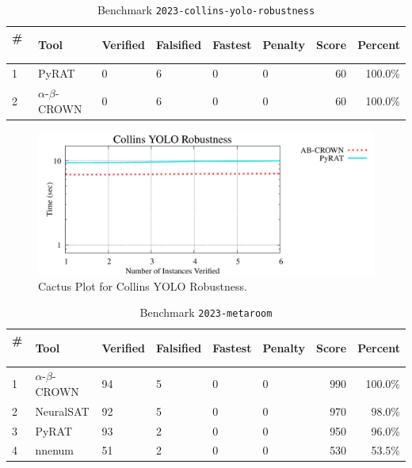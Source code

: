 
\begin{table}[h]
\begin{center}
\caption{Benchmark \texttt{2023-collins-yolo-robustness}} \label{tab:cat_{cat}}
{\setlength{\tabcolsep}{2pt}
\begin{tabular}[h]{@{}llllllrr@{}}
\toprule
\textbf{\# ~} & \textbf{Tool} & \textbf{Verified} & \textbf{Falsified} & \textbf{Fastest} & \textbf{Penalty} & \textbf{Score} & \textbf{Percent}\\
\midrule
1 & PyRAT & 0 & 6 & 0 & 0 & 60 & 100.0\% \\
2 & $\alpha$-$\beta$-CROWN & 0 & 6 & 0 & 0 & 60 & 100.0\% \\
\bottomrule
\end{tabular}
}
\end{center}
\end{table}



\begin{figure}[h]
\centerline{\includegraphics[width=\textwidth]{cactus/2023_collins_yolo_robustness.pdf}}
\caption{Cactus Plot for Collins YOLO Robustness.}
\label{fig:quantPic}
\end{figure}



\begin{table}[h]
\begin{center}
\caption{Benchmark \texttt{2023-metaroom}} \label{tab:cat_{cat}}
{\setlength{\tabcolsep}{2pt}
\begin{tabular}[h]{@{}llllllrr@{}}
\toprule
\textbf{\# ~} & \textbf{Tool} & \textbf{Verified} & \textbf{Falsified} & \textbf{Fastest} & \textbf{Penalty} & \textbf{Score} & \textbf{Percent}\\
\midrule
1 & $\alpha$-$\beta$-CROWN & 94 & 5 & 0 & 0 & 990 & 100.0\% \\
2 & NeuralSAT & 92 & 5 & 0 & 0 & 970 & 98.0\% \\
3 & PyRAT & 93 & 2 & 0 & 0 & 950 & 96.0\% \\
4 & nnenum & 51 & 2 & 0 & 0 & 530 & 53.5\% \\
\bottomrule
\end{tabular}
}
\end{center}
\end{table}



